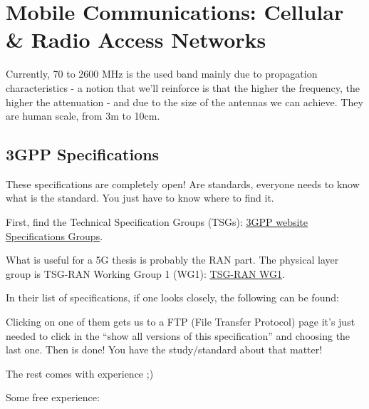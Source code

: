 \section{Mobile Communications: Cellular \& Radio Access Networks}



Currently, 70 to 2600 MHz is the used band mainly due to propagation characteristics - 
a notion that we'll reinforce is that the higher the frequency, the higher the 
attenuation - and due to the size of the antennas we can achieve. They are human scale,
from 3m to 10cm.






\subsection{3GPP Specifications}

These specifications are completely open! Are standards, everyone needs to know what is the standard. You just have to know where to find it.

First, find the Technical Specification Groups (TSGs):
\href{https://www.3gpp.org/specifications-groups/specifications-groups}{\ul{3GPP website Specifications Groups}}.


What is useful for a 5G thesis is probably the RAN part. The physical layer group is TSG-RAN Working Group 1 (WG1): \href{https://www.3gpp.org/Specifications-groups/ran-plenary/45-ran1-radio-layer-1}{\ul{TSG-RAN WG1}}.

In their list of specifications, if one looks closely, the following can be found:



Clicking on one of them gets us to a FTP (File Transfer Protocol) page it's just needed to click in the ``show all versions of this specification'' and choosing the last one. Then is done! You have the study/standard about that matter!

The rest comes with experience ;)

Some free experience:

